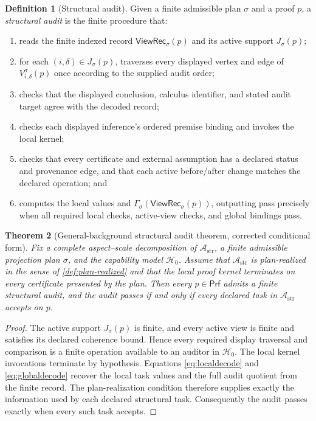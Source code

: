 \documentclass[11pt]{article}
\newcommand{\Prf}{\mathsf{Prf}}
\newcommand{\mcA}{\mathcal A}
\newcommand{\mcH}{\mathcal H_0}
\newcommand{\ViewRec}{\ensuremath{\mathsf{ViewRec}}}
\theoremstyle{plain}
\newtheorem{theorem}{Theorem}[section]
\theoremstyle{definition}
\newtheorem{definition}[theorem]{Definition}
\theoremstyle{remark}
\begin{document}
\begin{definition}[Structural audit]
\label{def:structaudit}
Given a finite admissible plan $\sigma$ and a proof $p$, a
\emph{structural audit} is the finite procedure that:
\begin{enumerate}
    \item reads the finite indexed record $\ViewRec_\sigma(p)$ and its active
    support $J_\sigma(p)$;
    \item for each $(i,\delta)\in J_\sigma(p)$, traverses every displayed vertex
    and edge of $V^\sigma_{i,\delta}(p)$ once according to the supplied audit
    order;
    \item checks that the displayed conclusion, calculus identifier, and stated
    audit target agree with the decoded record;
    \item checks each displayed inference's ordered premise binding and invokes
    the local kernel;
    \item checks that every certificate and external assumption has a declared
    status and provenance edge, and that each active before/after change matches
    the declared operation; and
    \item computes the local values and
    $\Gamma_\sigma(\ViewRec_\sigma(p))$, outputting \textsf{pass} precisely when
    all required local checks, active-view checks, and global bindings pass.
\end{enumerate}
\end{definition}

\begin{theorem}[General-background structural audit theorem, corrected conditional form]
\label{thm:human-audit}
Fix a complete aspect--scale decomposition of $\mcA_{\mathrm{str}}$, a finite
admissible projection plan $\sigma$, and the capability model $\mcH$.  Assume
that $\mcA_{\mathrm{str}}$ is plan-realized in the sense of
\cref{def:plan-realized} and that the local proof kernel terminates on every
certificate presented by the plan.  Then every $p\in\Prf$ admits a finite
structural audit, and the audit passes if and only if every declared task in
$\mcA_{\mathrm{str}}$ accepts on $p$.
\end{theorem}

\begin{proof}
The active support $J_\sigma(p)$ is finite, and every active view is finite and
satisfies its declared coherence bound.  Hence every required display traversal
and comparison is a finite operation available to an auditor in $\mcH$.  The
local kernel invocations terminate by hypothesis.  Equations
\eqref{eq:localdecode} and \eqref{eq:globaldecode} recover the local task values
and the full audit quotient from the finite record.  The plan-realization
condition therefore supplies exactly the information used by each declared
structural task.  Consequently the audit passes exactly when every such task
accepts.
\end{proof}
\end{document}
